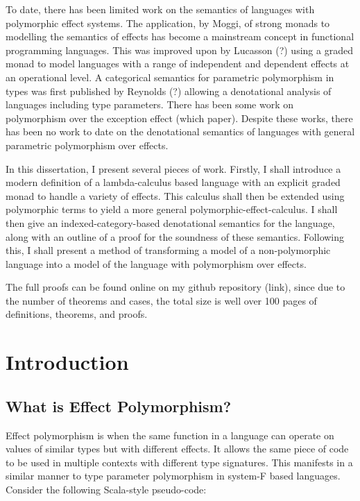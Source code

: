 \documentclass{Report}
\begin{document}
\abstract


    
To date, there has been limited work on the semantics of languages with polymorphic effect systems. The application, by Moggi, of strong monads to modelling the semantics of effects has become a mainstream concept in functional programming languages. This was improved upon by Lucasson (?) using a graded monad to model languages with a range of independent and dependent effects at an operational level. A categorical semantics for parametric polymorphism in types was first published by Reynolds (?) allowing a denotational analysis of languages including type parameters. There has been some work on polymorphism over the exception effect (which paper). Despite these works, there has been no work to date on the denotational semantics of languages with general parametric polymorphism over effects.

In this dissertation, I present several pieces of work. Firstly, I shall introduce a modern definition of a lambda-calculus based language with an explicit graded monad to handle a variety of effects. This calculus shall then be extended using polymorphic terms to yield a more general polymorphic-effect-calculus. I shall then give an indexed-category-based denotational semantics for the language, along with an outline of a proof for the soundness of these semantics. Following this, I shall present a method of transforming a model of a non-polymorphic language into a model of the language with polymorphism over effects.

The full proofs can be found online on my github repository (link), since due to the number of theorems and cases, the total size is well over 100 pages of definitions, theorems, and proofs.

\chapter{Introduction}
\section{What is Effect Polymorphism?}
Effect polymorphism is when the same function in a language can operate on values of similar types but with different effects. It allows the same piece of code to be used in multiple contexts with different type signatures. This manifests in a similar manner to type parameter polymorphism in system-F based languages. Consider the following Scala-style pseudo-code:
\end{document}
